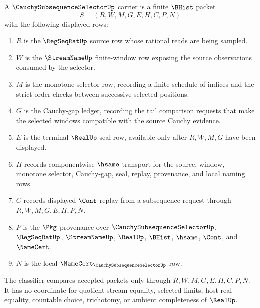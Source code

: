 \begin{definition}
\label{def:cauchy-subsequence-selector-carrier}
A $\CauchySubsequenceSelectorUp$ carrier is a finite $\BHist$ packet
$$
S=(R,W,M,G,E,H,C,P,N)
$$
with the following displayed rows:
\begin{enumerate}
\item $R$ is the $\RegSeqRatUp$ source row whose rational reads are being sampled.
\item $W$ is the $\StreamNameUp$ finite-window row exposing the source observations consumed by the selector.
\item $M$ is the monotone selector row, recording a finite schedule of indices and the strict order checks between successive selected positions.
\item $G$ is the Cauchy-gap ledger, recording the tail comparison requests that make the selected windows compatible with the source Cauchy evidence.
\item $E$ is the terminal $\RealUp$ seal row, available only after $R,W,M,G$ have been displayed.
\item $H$ records componentwise $\hsame$ transport for the source, window, monotone selector, Cauchy-gap, seal, replay, provenance, and local naming rows.
\item $C$ records displayed $\Cont$ replay from a subsequence request through $R,W,M,G,E,H,P,N$.
\item $P$ is the $\Pkg$ provenance over $\CauchySubsequenceSelectorUp$, $\RegSeqRatUp$, $\StreamNameUp$, $\RealUp$, $\BHist$, $\hsame$, $\Cont$, and $\NameCert$.
\item $N$ is the local $\NameCert_{\CauchySubsequenceSelectorUp}$ row.
\end{enumerate}
The classifier compares accepted packets only through $R,W,M,G,E,H,C,P,N$. It has no coordinate for quotient stream equality, selected limits, host real equality, countable choice, trichotomy, or ambient completeness of $\RealUp$.
\end{definition}

